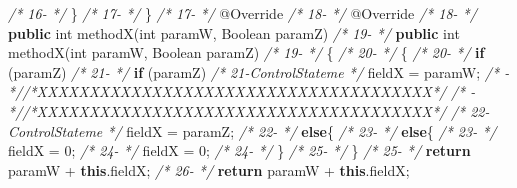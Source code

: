 \documentclass[
]{article}
\newenvironment{Shaded}{\begin{snugshade}}{\end{snugshade}}
\newcommand{\AttributeTok}[1]{\textcolor[rgb]{0.77,0.63,0.00}{#1}}
\newcommand{\BuiltInTok}[1]{#1}
\newcommand{\CommentTok}[1]{\textcolor[rgb]{0.56,0.35,0.01}{\textit{#1}}}
\newcommand{\DataTypeTok}[1]{\textcolor[rgb]{0.13,0.29,0.53}{#1}}
\newcommand{\DecValTok}[1]{\textcolor[rgb]{0.00,0.00,0.81}{#1}}
\newcommand{\FunctionTok}[1]{\textcolor[rgb]{0.00,0.00,0.00}{#1}}
\newcommand{\KeywordTok}[1]{\textcolor[rgb]{0.13,0.29,0.53}{\textbf{#1}}}
\newcommand{\NormalTok}[1]{#1}
\begin{document}
\begin{landscape}
\begin{Shaded}
\begin{Highlighting}[]
\CommentTok{/* 16-                 */}\NormalTok{    \}                                                          }\CommentTok{/* 17-                 */}\NormalTok{    \}                                                          }
\CommentTok{/* 17-                 */}    \AttributeTok{@Override}                                                  \CommentTok{/* 18-                 */}    \AttributeTok{@Override}                                                  
\CommentTok{/* 18-                 */}    \KeywordTok{public} \DataTypeTok{int} \FunctionTok{methodX}\NormalTok{(}\DataTypeTok{int}\NormalTok{ paramW, }\BuiltInTok{Boolean}\NormalTok{ paramZ)             }\CommentTok{/* 19-                 */}    \KeywordTok{public} \DataTypeTok{int} \FunctionTok{methodX}\NormalTok{(}\DataTypeTok{int}\NormalTok{ paramW, }\BuiltInTok{Boolean}\NormalTok{ paramZ)             }
\CommentTok{/* 19-                 */}\NormalTok{    \{                                                          }\CommentTok{/* 20-                 */}\NormalTok{    \{                                                          }
\CommentTok{/* 20-                 */}        \KeywordTok{if}\NormalTok{ (paramZ)                                            }\CommentTok{/* 21-                 */}        \KeywordTok{if}\NormalTok{ (paramZ)                                            }
\CommentTok{/* 21-ControlStateme   */}\NormalTok{            fieldX = paramW;                                   }\CommentTok{/*   -                 *//*XXXXXXXXXXXXXXXXXXXXXXXXXXXXXXXXXXXXXX*/}                     
\CommentTok{/*   -                 *//*XXXXXXXXXXXXXXXXXXXXXXXXXXXXXXXXXXXXXX*/}                     \CommentTok{/* 22-ControlStateme   */}\NormalTok{            fieldX = paramZ;                                   }
\CommentTok{/* 22-                 */}        \KeywordTok{else}\NormalTok{\{                                                  }\CommentTok{/* 23-                 */}        \KeywordTok{else}\NormalTok{\{                                                  }
\CommentTok{/* 23-                 */}\NormalTok{            fieldX = }\DecValTok{0}\NormalTok{;                                        }\CommentTok{/* 24-                 */}\NormalTok{            fieldX = }\DecValTok{0}\NormalTok{;                                        }
\CommentTok{/* 24-                 */}\NormalTok{        \}                                                      }\CommentTok{/* 25-                 */}\NormalTok{        \}                                                      }
\CommentTok{/* 25-                 */}        \KeywordTok{return}\NormalTok{ paramW + }\KeywordTok{this}\NormalTok{.}\FunctionTok{fieldX}\NormalTok{;                           }\CommentTok{/* 26-                 */}        \KeywordTok{return}\NormalTok{ paramW + }\KeywordTok{this}\NormalTok{.}\FunctionTok{fieldX}\NormalTok{;                           }

\end{Highlighting}
\end{Shaded}
\end{landscape}
\end{document}

